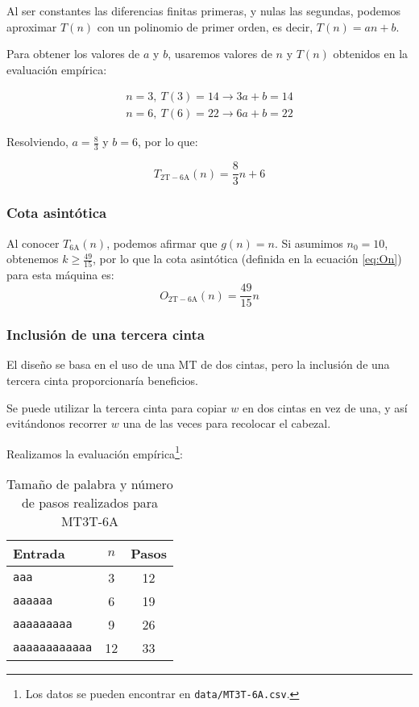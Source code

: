 Al ser constantes las diferencias finitas primeras, y nulas las segundas, podemos aproximar $T(n)$ con un polinomio de primer orden, es decir, $T(n) = an + b$.\medskip

Para obtener los valores de $a$ y $b$, usaremos valores de $n$ y $T(n)$ obtenidos en la evaluación empírica:

\begin{subequations}
    \begin{gather*}
        n = 3,\ T(3) = 14 \rightarrow 3a + b = 14 \\
        n = 6,\ T(6) = 22 \rightarrow 6a + b = 22
    \end{gather*}
\end{subequations}

Resolviendo, $a=\frac{8}{3}$ y $b=6$, por lo que:

\begin{equation}
    T_{\mathrm{2T-6A}}(n) = \frac{8}{3}n + 6
\end{equation}


\subsubsection*{Cota asintótica}
Al conocer $T_{\mathrm{6A}}(n)$, podemos afirmar que $g(n) = n$. Si asumimos $n_0 = 10$, obtenemos $k \geq \frac{49}{15}$, por lo que la cota asintótica (definida en la ecuación \ref{eq:On}) para esta máquina es:
\begin{equation}
    O_{\mathrm{2T-6A}}(n) = \frac{49}{15} n
\end{equation}



\subsubsection*{Inclusión de una tercera cinta} \label{sec:MT3T-6A}
El diseño se basa en el uso de una MT de dos cintas, pero la inclusión de una tercera cinta proporcionaría beneficios.

Se puede utilizar la tercera cinta para copiar $w$ en dos cintas en vez de una, y así evitándonos recorrer $w$ una de las veces para recolocar el cabezal.


Realizamos la evaluación empírica\footnote{Los datos se pueden encontrar en \texttt{data/MT3T-6A.csv}.}:

\begin{table}[h]
    \centering
    \begin{tabular}{lcc}
        Entrada & $n$ & Pasos \\
        \hline
        \texttt{aaa}                &  3  & 12 \\
        \texttt{aaaaaa}             &  6  & 19 \\
        \texttt{aaaaaaaaa}          &  9  & 26 \\
        \texttt{aaaaaaaaaaaa}       & 12  & 33 \\
    \end{tabular}
    \caption{Tamaño de palabra y número de pasos realizados para MT3T-6A}
\end{table}

